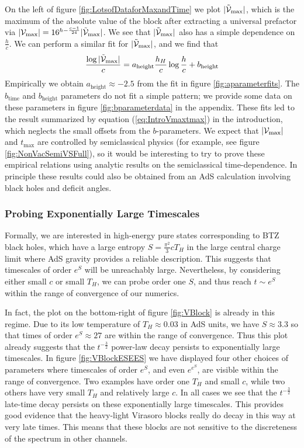 \documentclass[12pt]{article}
\numberwithin{equation}{section}
\newcommand{\be}{\begin{eqnarray}}
\newcommand{\ee}{\end{eqnarray}}
\newcommand{\CV}{{\cal V}}
\begin{document}
On the left of figure \ref{fig:LotsofDataforMaxandTime} we plot $|\tilde \CV_{\max}|$, which is the maximum of the absolute value of the block after extracting a universal prefactor via $|\CV_{\max}| =16^{h - \frac{c-1}{24}} |\tilde \CV_{\max}|$.  We see that $|\tilde \CV_{\max}|$  also has a simple dependence on $\frac{h}{c}$.  We can perform a similar fit for $|\tilde{\CV}_{\max}|$, and we find that
\be \label{eq:Vmaxdef}
\frac{\log |\tilde \CV_{\max}|}{c}  =a_{\text{height}} \frac{h_H}{c} \log \frac{h}{c} + b_{\text{height}} 
\ee
Empirically we obtain $a_{\text{height}} \approx -2.5$ from the fit in figure \ref{fig:aparameterfits}.  The $b_{\text{time}}$ and $b_{\text{height}}$ parameters do not fit a simple pattern; we provide some data on these parameters in figure \ref{fig:bparameterdata} in the appendix.  These fits led to the result summarized by equation (\ref{eq:IntroVmaxtmax}) in the introduction, which neglects the small offsets from the $b$-parameters.  We expect that $|\CV_{\text{max}}|$ and $t_{\text{max}}$ are controlled by semiclassical physics (for example, see figure \ref{fig:NonVacSemiVSFull}), so it would be interesting to try to prove these empirical relations using analytic results \cite{Fitzpatrick:2016mjq} on the semiclassical time-dependence.  In principle these results could also be obtained from an AdS calculation involving black holes and deficit angles.

\subsubsection{Probing Exponentially Large Timescales}

Formally, we are interested in high-energy pure states corresponding to BTZ black holes, which have a large entropy $S = \frac{\pi^2}{3} c T_H$ in the large central charge limit where AdS gravity provides a reliable description.  This suggests that timescales of order $e^S$ will be unreachably large.  Nevertheless, by considering either small $c$ or small $T_H$, we can probe order one $S$, and thus reach $t \sim e^S$ within the range of convergence of our numerics.  

In fact, the plot on the bottom-right of figure \ref{fig:VBlock} is already in this regime.  Due to its low temperature of $T_H \approx 0.03$ in AdS units, we have $S \approx 3.3$ so that times of order $e^S \approx 27$ are within the range of convergence.  Thus this plot already suggests that the $t^{-\frac{3}{2}}$ power-law decay persists to exponentially large timescales.  In figure \ref{fig:VBlockESEES} we have displayed four other choices of parameters where timescales of order $e^S$, and even $e^{e^S}$, are visible within the range of convergence.  Two examples have order one $T_H$ and small $c$, while two others have very small $T_H$ and relatively large $c$.  In all cases we see that the $t^{-\frac{3}{2}}$ late-time decay persists on these exponentially large timescales.  This provides good evidence that the heavy-light Virasoro blocks really do decay in this way at very late times.  This means that these blocks are not sensitive to the discreteness of the spectrum in other channels.
\end{document}
